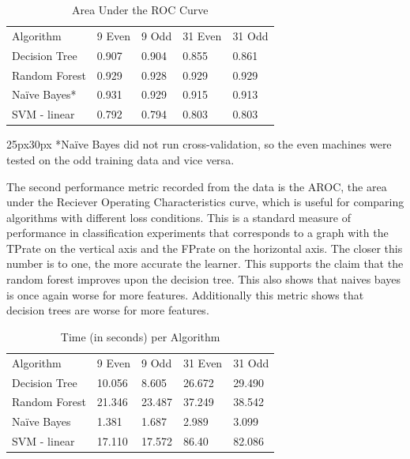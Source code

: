 \documentclass[aps, reprint, amsmath, amssymb]{revtex4-1}
\begin{document}
\begin{table}[H]
  \begin{center}
    \caption{Area Under the ROC Curve} \label{tab:title} 
    \begin{tabular}{ | l || l | l | l | l |}
      \hline
      Algorithm & 9 Even & 9 Odd & 31 Even & 31 Odd \\ \hhline{|=||=|=|=|=|}
      Decision Tree & 0.907 & 0.904 & 0.855 & 0.861 \\ \hline
      Random Forest & 0.929 & 0.928  & 0.929  & 0.929 \\ \hline
      Na{\"i}ve Bayes* & 0.931  & 0.929 & 0.915 & 0.913 \\ \hline
      SVM - linear & 0.792 & 0.794 & 0.803 & 0.803 \\ \hline
    \end{tabular}
  \end{center}
  \begin{changemargin}{25px}{30px}
  \footnotesize{
  *Na{\"i}ve Bayes did not run cross-validation, so the even machines were tested on the odd training data and vice versa.}
  \end{changemargin}
\end{table}

The second performance metric recorded from the data is the AROC, the area under the Reciever Operating Characteristics curve, which is useful for comparing algorithms with different loss conditions. This is a standard measure of performance in classification experiments that corresponds to a graph with the TPrate on the vertical axis and the FPrate on the horizontal axis. The closer this number is to one, the more accurate the learner.  This supports the claim that the random forest improves upon the decision tree. This also shows that naives bayes is once again worse for more features.  Additionally this metric shows that decision trees are worse for more features.


\begin{table}[H]
  \begin{center}
    \caption{Time (in seconds) per Algorithm} \label{tab:title} 
    \begin{tabular}{ | l || l | l | l | l |}  
      \hline
      Algorithm & 9 Even & 9 Odd & 31 Even & 31 Odd \\ \hhline{|=||=|=|=|=|}
      Decision Tree & 10.056 & 8.605 & 26.672 & 29.490 \\ \hline
      Random Forest & 21.346 & 23.487 & 37.249 & 38.542 \\ \hline
      Na{\"i}ve Bayes & 1.381 & 1.687 & 2.989 & 3.099 \\ \hline
      SVM - linear & 17.110 & 17.572 & 86.40 & 82.086 \\ \hline
    \end{tabular}
  \end{center}
\end{table}
\end{document}
